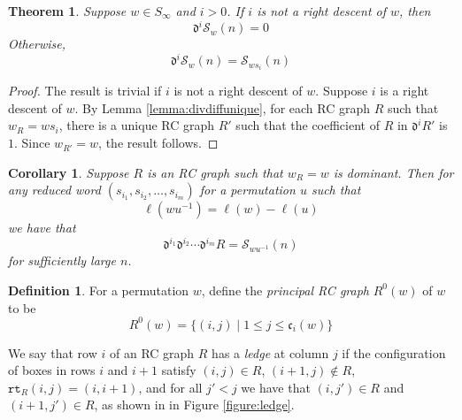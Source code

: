 \documentclass{amsart}
\newtheorem{corollary}[lemma]{Corollary}
\newtheorem{theorem}{Theorem}[section]
\theoremstyle{definition}
\newtheorem{definition}[lemma]{Definition}
\theoremstyle{remark}
\numberwithin{equation}{subsection}
\newcommand{\wof}[1]{w_{#1}}
\newcommand{\rcdd}{\mathfrak{d}}
\newcommand{\rtt}{\mathtt{rt}}
\newcommand{\code}{\mathfrak{c}}
\begin{document}
\begin{theorem} \label{theorem:divdiffschubert}
	Suppose $w\in S_\infty$ and $i >0$. If $i$ is not a right descent of $w$, then
	$$\rcdd^i\mathcal{S}_w(n) = 0$$
	Otherwise,
	$$\rcdd^i\mathcal{S}_w(n) = \mathcal{S}_{ws_i}(n)$$
\end{theorem}
\begin{proof}
	The result is trivial if $i$ is not a right descent of $w$. Suppose $i$ is a right descent of $w$. By Lemma \ref{lemma:divdiffunique}, for each RC graph $R$ such that $\wof{R} = ws_i$, there is a unique RC graph $R'$ such that the coefficient of $R$ in $\rcdd^iR'$ is $1$. Since $\wof{R'} = w$, the result follows.
\end{proof}

\begin{corollary} \label{corollary:generateschubert}
Suppose $R$ is an RC graph such that $\wof{R} = w$ is dominant. Then for any reduced word $(s_{i_1}, s_{i_2}, \ldots, s_{i_m})$ for a permutation $u$ such that
$$\ell(wu^{-1}) = \ell(w) - \ell(u)$$
we have that
$$\rcdd^{i_1}\rcdd^{i_2}\cdots \rcdd^{i_m}R = \mathcal{S}_{wu^{-1}}(n)$$
for sufficiently large $n$.
\end{corollary}


\begin{definition}
For a permutation $w$, define the \emph{principal RC graph} $R^0(w)$ of $w$ to be
$$R^0(w) = \{(i,j)\mid 1\leq j\leq \code_i(w)\}$$

We say that row $i$ of an RC graph $R$ has a \emph{ledge} at column $j$ if the configuration of boxes in rows $i$ and $i+1$ satisfy $(i,j)\in R$, $(i+1,j)\notin  R$, $\rtt_R(i,j)=(i,i+1)$, and for all $j' < j$ we have that $(i,j')\in R$ and $(i+1,j')\in R$, as shown in in Figure \ref{figure:ledge}.
\end{definition}
\end{document}
